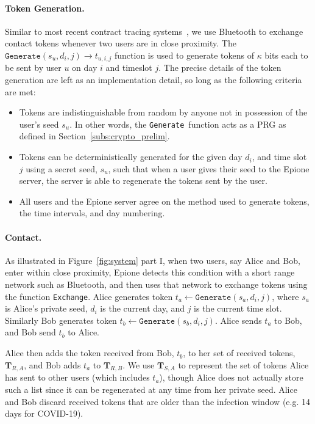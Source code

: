 \documentclass[11pt]{article} %
\newcommand{\sectionref}[1]{Section~\ref{#1}}
\newcommand{\figureref}[1]{Figure~\ref{#1}}
\newcommand{\dect}{\textsf{Epione}\xspace}
\newcommand{\ctgenerate}{\texttt{Generate}}
\newcommand{\ctexchange}{\texttt{Exchange}}
\newcommand{\sT}{\mathbf{T}}
\renewcommand\to{\ensuremath{\rightarrow}}
\begin{document}
\paragraph{Token Generation.}

Similar to most recent contract tracing systems~\cite{cho2020contact,Covid-watch,CEN,chan2020pact}, we use Bluetooth to exchange contact tokens whenever two users are in close proximity. The $\ctgenerate(s_u, d_i, j) \to t_{u,i,j}$ function is used to generate tokens of $\kappa$ bits each to be sent by user $u$ on day $i$ and timeslot $j$. The precise details of the token generation are left as an implementation detail, so long as the following criteria are met:

\begin{itemize}
	\item Tokens are indistinguishable from random by anyone not in possession of the user's seed $s_u$. In other words, the \ctgenerate\ function acts as a PRG as defined in \sectionref{subs:crypto_prelim}.
	
	\item Tokens can be deterministically generated for the given day $d_i$, and time slot $j$ using a secret seed, $s_u$, such that when a user gives their seed to the \dect server, the server is able to regenerate the tokens sent by the user.
	
	\item All users and the \dect server agree on the method used to generate tokens, the time intervals, and day numbering.
\end{itemize}

\paragraph{Contact.}

As illustrated in \figureref{fig:system} part I, when two users, say Alice and Bob, enter within close proximity, \dect detects this condition with a short range network such as Bluetooth, and then uses that network to exchange tokens using the function \ctexchange. Alice generates token $t_a \gets \ctgenerate(s_a, d_i, j)$, where $s_a$ is Alice's private seed, $d_i$ is the current day, and $j$ is the current time slot. Similarly Bob generates token $t_b \gets \ctgenerate(s_b, d_i, j)$. Alice sends $t_a$ to Bob, and Bob send $t_b$ to Alice.

Alice then adds the token received from Bob, $t_b$, to her set of received tokens, $\sT_{R,A}$, and Bob adds $t_a$ to $\sT_{R,B}$. We use $\sT_{S,A}$ to represent the set of tokens Alice has sent to other users (which includes $t_a$), though Alice does not actually store such a list since it can be regenerated at any time from her private seed. Alice and Bob discard received tokens that are older than the infection window (e.g. 14 days for COVID-19).
\end{document}
